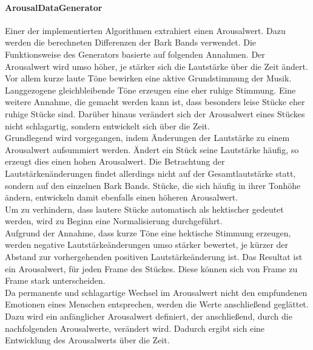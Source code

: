 \documentclass[11pt,a4paper]{article}
\begin{document}
\paragraph{ArousalDataGenerator}
Einer der implementierten Algorithmen extrahiert einen Arousalwert. Dazu werden die berechneten Differenzen der Bark Bands verwendet. Die Funktionsweise des Generators basierte auf folgenden Annahmen. Der Arousalwert wird umso höher, je stärker sich die Lautstärke über die Zeit ändert. Vor allem kurze laute Töne bewirken eine aktive Grundstimmung der Musik. Langgezogene gleichbleibende Töne erzeugen eine eher ruhige Stimmung. Eine weitere Annahme, die gemacht werden kann ist, dass besonders leise Stücke eher ruhige Stücke sind. Darüber hinaus verändert sich der Arousalwert eines Stückes nicht schlagartig, sondern entwickelt sich über die Zeit.\\
Grundlegend wird vorgegangen, indem Änderungen der Lautstärke zu einem Arousalwert aufsummiert werden. Ändert ein Stück seine Lautstärke häufig, so erzeugt dies einen hohen Arousalwert. Die Betrachtung der Lautstärkenänderungen findet allerdings nicht auf der Gesamtlautstärke statt, sondern auf den einzelnen Bark Bands. Stücke, die sich häufig in ihrer Tonhöhe ändern, entwickeln damit ebenfalls einen höheren Arousalwert.\\
Um zu verhindern, dass lautere Stücke automatisch als hektischer gedeutet werden, wird zu Beginn eine Normalisierung durchgeführt.\\
Aufgrund der Annahme, dass kurze Töne eine hektische Stimmung erzeugen, werden negative Lautstärkeänderungen umso stärker bewertet, je kürzer der Abstand zur vorhergehenden positiven Lautstärkeänderung ist. Das Resultat ist ein Arousalwert, für jeden Frame des Stückes. Diese können sich von Frame zu Frame stark unterscheiden.\\
Da permanente und schlagartige Wechsel im Arousalwert nicht den empfundenen Emotionen eines Menschen entsprechen, werden die Werte anschließend geglättet. Dazu wird ein anfänglicher Arousalwert definiert, der anschließend, durch die nachfolgenden Arousalwerte, verändert wird. Dadurch ergibt sich eine Entwicklung des Arousalwerts über die Zeit.
\end{document}
